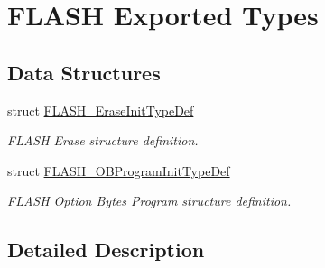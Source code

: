 \hypertarget{group___f_l_a_s_h_ex___exported___types}{}\section{F\+L\+A\+SH Exported Types}
\label{group___f_l_a_s_h_ex___exported___types}
\subsection*{Data Structures}
\begin{DoxyCompactItemize}
\item 
struct \mbox{\hyperlink{struct_f_l_a_s_h___erase_init_type_def}{F\+L\+A\+S\+H\+\_\+\+Erase\+Init\+Type\+Def}}
\begin{DoxyCompactList}\small\item\em F\+L\+A\+SH Erase structure definition. \end{DoxyCompactList}\item 
struct \mbox{\hyperlink{struct_f_l_a_s_h___o_b_program_init_type_def}{F\+L\+A\+S\+H\+\_\+\+O\+B\+Program\+Init\+Type\+Def}}
\begin{DoxyCompactList}\small\item\em F\+L\+A\+SH Option Bytes Program structure definition. \end{DoxyCompactList}\end{DoxyCompactItemize}


\subsection{Detailed Description}
